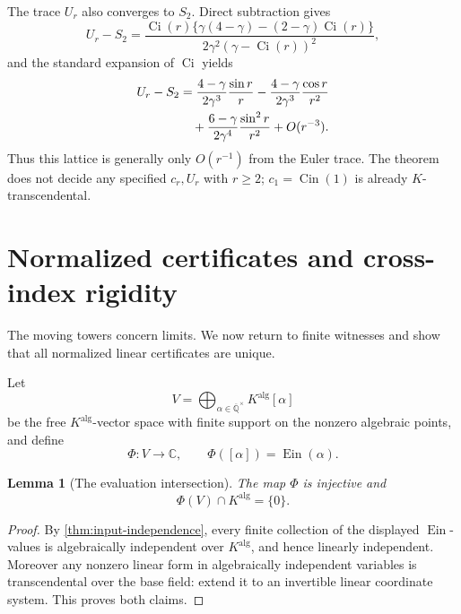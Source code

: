 \documentclass[11pt]{article}
\theoremstyle{keio}
\newtheorem{lemma}[theorem]{Lemma}
\theoremstyle{definition}
\theoremstyle{remark}
\newcommand{\Qbar}{\overline{\mathbb Q}}
\newcommand{\C}{\mathbb C}
\newcommand{\Ein}{\operatorname{Ein}}
\newcommand{\Cin}{\operatorname{Cin}}
\newcommand{\Ci}{\operatorname{Ci}}
\begin{document}
The trace \(U_r\) also converges to \(S_2\).  Direct subtraction gives
\begin{equation}\label{eq:Ur-S2-exact}
 U_r-S_2=
 \frac{\Ci(r)\{\gamma(4-\gamma)-(2-\gamma)\Ci(r)\}}
 {2\gamma^2(\gamma-\Ci(r))^2},
\end{equation}
and the standard expansion of \(\Ci\) yields
\begin{align}
 U_r-S_2
 &=\frac{4-\gamma}{2\gamma^3}\frac{\sin r}{r}
 -\frac{4-\gamma}{2\gamma^3}\frac{\cos r}{r^2}\notag\\
 &\quad+
 \frac{6-\gamma}{2\gamma^4}\frac{\sin^2r}{r^2}
 +O(r^{-3}).\label{eq:Ur-S2-asymptotic}
\end{align}
Thus this lattice is generally only \(O(r^{-1})\) from the Euler trace.
The theorem does not decide any specified \(c_r,U_r\) with \(r\ge2\);
\(c_1=\Cin(1)\) is already \(K\)-transcendental.

\section{Normalized certificates and cross-index rigidity}
\label{sec:certificates}

The moving towers concern limits.  We now return to finite witnesses and
show that all normalized linear certificates are unique.

Let
\[
 V=\bigoplus_{\alpha\in\Qbar^\times}K^{\mathrm{alg}}[\alpha]
\]
be the free \(K^{\mathrm{alg}}\)-vector space with finite support on the
nonzero algebraic points, and define
\[
 \Phi:V\longrightarrow\C,
 \qquad \Phi([\alpha])=\Ein(\alpha).
\]

\begin{lemma}[The evaluation intersection]
\label{lem:evaluation-intersection}
The map \(\Phi\) is injective and
\begin{equation}\label{eq:Phi-intersection}
 \Phi(V)\cap K^{\mathrm{alg}}=\{0\}.
\end{equation}
\end{lemma}

\begin{proof}
By \cref{thm:input-independence}, every finite collection of the displayed
\(\Ein\)-values is algebraically independent over \(K^{\mathrm{alg}}\), and
hence linearly independent.  Moreover any nonzero linear form in
algebraically independent variables is transcendental over the base field:
extend it to an invertible linear coordinate system.  This proves both
claims.
\end{proof}
\end{document}
